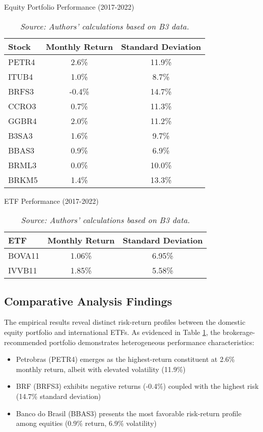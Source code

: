 \documentclass{article}
\begin{document}
\begin{table}[h]
\centering
\caption{Equity Portfolio Performance (2017-2022)}
\label{tab:equity_perf}
\begin{tabular}{lcc}
\hline
Stock & Monthly Return & Standard Deviation \\ \hline
PETR4 & 2.6\% & 11.9\% \\
ITUB4 & 1.0\% & 8.7\% \\
BRFS3 & -0.4\% & 14.7\% \\
CCRO3 & 0.7\% & 11.3\% \\
GGBR4 & 2.0\% & 11.2\% \\
B3SA3 & 1.6\% & 9.7\% \\
BBAS3 & 0.9\% & 6.9\% \\
BRML3 & 0.0\% & 10.0\% \\
BRKM5 & 1.4\% & 13.3\% \\ \hline
\end{tabular}
\smallskip
\vspace{0.4cm}
\caption*{\textit{Source: Authors' calculations based on B3 data.}}
\end{table}

\begin{table}[h]
\centering
\caption{ETF Performance (2017-2022)}
\label{tab:etf_perf}
\begin{tabular}{lcc}
\hline
ETF & Monthly Return & Standard Deviation \\ \hline
BOVA11 & 1.06\% & 6.95\% \\
IVVB11 & 1.85\% & 5.58\% \\ \hline
\end{tabular}
\smallskip
\vspace{0.4cm}
\caption*{\textit{Source: Authors' calculations based on B3 data.}}
\end{table}

\subsection{Comparative Analysis Findings}
The empirical results reveal distinct risk-return profiles between the domestic equity portfolio and international ETFs. As evidenced in Table \ref{tab:equity_perf}, the brokerage-recommended portfolio demonstrates heterogeneous performance characteristics:

\begin{itemize}
    \item Petrobras (PETR4) emerges as the highest-return constituent at 2.6\% monthly return, albeit with elevated volatility (11.9\%)
    \item BRF (BRFS3) exhibits negative returns (-0.4\%) coupled with the highest risk (14.7\% standard deviation)
    \item Banco do Brasil (BBAS3) presents the most favorable risk-return profile among equities (0.9\% return, 6.9\% volatility)
\end{itemize}
\end{document}
